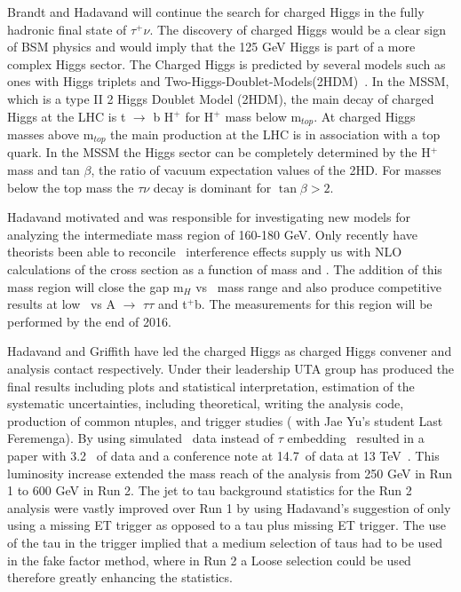 \label{charged-Higgs}
Brandt and Hadavand will continue the search for charged Higgs in the fully hadronic final state of $\tau^+ \nu$.  The discovery of charged Higgs  would be a clear sign of BSM physics 
and would imply that the 125 GeV Higgs is part of a more complex Higgs sector. 
The Charged Higgs is predicted by several models such as ones with Higgs triplets and Two-Higgs-Doublet-Models(2HDM)~\cite{2hdm1,2hdm2,2hdm3}. 
In the MSSM, which is a type II 2 Higgs Doublet Model (2HDM), the main decay of charged Higgs at the LHC is t $\rightarrow$ b H$^+$ for H$^+$ mass below m$_{top}$. At charged Higgs masses above m$_{top}$
the main production at the LHC is in association with a top quark.  In the MSSM the Higgs sector can be completely determined by the H$^+$ mass and tan $\beta$, the ratio of vacuum expectation values of the 2HD.
For masses below the top mass the $\tau \nu$ decay is dominant for $\tan \beta >2 $. 


Hadavand motivated and was responsible for investigating new models for analyzing the intermediate mass region of 160-180 GeV.
Only recently have theorists been able to reconcile \ttbar\ interference effects supply us with NLO  calculations of the cross section as a function of mass and \tanb.
The addition of this mass region will close the gap m$_{H}$ vs \tanb\ mass range and also produce competitive results at low \tanb\ vs A $\rightarrow$ $\tau \tau$ and \Hp \too t$^+$b.  
The measurements for this region will be performed by the end of 2016.

Hadavand and Griffith have led the charged Higgs as charged Higgs convener and analysis contact respectively.  Under their leadership UTA group has produced the final results including plots and statistical
interpretation, estimation of the systematic uncertainties, including theoretical, writing the analysis code, production of common ntuples, and trigger studies ( with Jae Yu's student Last Feremenga).  
By using simulated \ttbar\ data instead of $\tau$ embedding~\cite{embedding} resulted in a paper with 3.2 \invfb\ of data and a conference note at 14.7\invfb\ of data at 13 TeV~\cite{taunu,hptnu1}.  This luminosity increase extended the mass reach of the analysis from 250 GeV in Run 1 to 600 GeV in Run 2.
The jet to tau background statistics for the Run 2 analysis were vastly improved over Run 1 by using Hadavand's suggestion of only using a missing ET trigger as opposed to a tau plus missing ET trigger.  The use of the tau in the trigger implied that a medium selection of taus had to be used in the fake factor method, 
where in Run 2 a Loose selection could be used therefore greatly enhancing the statistics.

